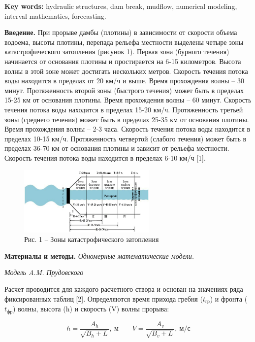 {\bfseries Key words:} hydraulic structures, dam break, mudflow, numerical
modeling, interval mathematics, forecasting.

\begin{multicols}{2}
{\bfseries Введение.} При прорыве дамбы (плотины) в зависимости от скорости
объема водоема, высоты плотины, перепада рельефа местности выделены
четыре зоны катастрофического затопления (рисунок 1). Первая зона
(бурного течения) начинается от основания плотины и простирается на 6-15
километров. Высота волны в этой зоне может достигать нескольких метров.
Скорость течения потока воды находится в пределах от 20 км/ч и выше.
Время прохождения волны -- 30 минут. Протяженность второй зоны (быстрого
течения) может быть в пределах 15-25 км от основания плотины. Время
прохождения волны -- 60 минут. Скорость течения потока воды находится в
пределах 15-20 км/ч. Протяженность третьей зоны (среднего течения) может
быть в пределах 25-35 км от основания плотины. Время прохождения волны
-- 2-3 часа. Скорость течения потока воды находится в пределах 10-15
км/ч. Протяженность четвертой (слабого течения) может быть в пределах
36-70 км от основания плотины и зависит от рельефа местности. Скорость
течения потока воды находится в пределах 6-10 км/ч {[}1{]}.
\end{multicols}

\begin{figure}[H]
	\centering
	\includegraphics[width=0.6\textwidth]{assets/61}
	\caption*{Рис. 1 -- Зоны катастрофического затопления}
\end{figure}

{\bfseries Материалы и методы.} \emph{Одномерные математические модели.}

\emph{Модель A.M. Прудовского}

Расчет проводится для каждого расчетного створа и основан на значениях
ряда фиксированных таблиц {[}2{]}. Определяются время прихода гребня
(\(t_{гр}\)) и фронта (\(t_{фр}\)) волны, высота (h) и скорость (V)
волны прорыва:

\begin{equation}
h = \frac{A_{h}}{\sqrt{B_{h} + L}},\ \text{м}\qquad V = \frac{A_{v}}{\sqrt{B_{v} + L}},\ \text{м/с}
\end{equation}

